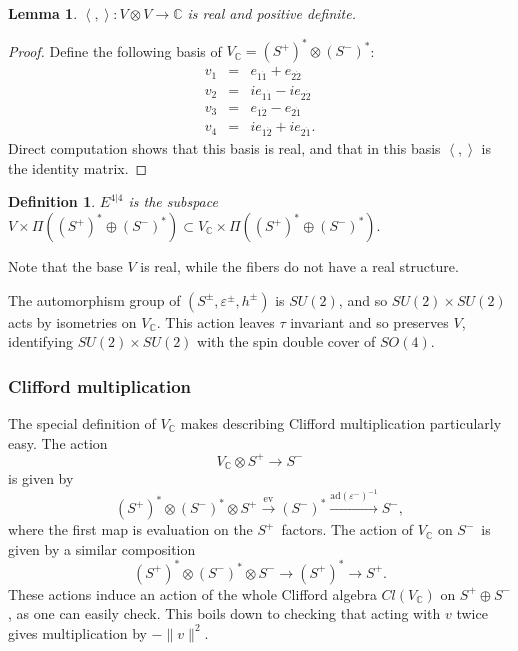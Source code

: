 \documentclass[twoside]{amsart}
\newcommand{\CC}{\ensuremath{\mathbb{C}}}
\newtheorem{definition}{Definition}
\newtheorem{lemma}{Lemma}
\renewcommand{\epsilon}{\varepsilon}
\newcommand{\enm}[1]{\ensuremath{#1}}
\newcommand{\superijk}[3]{\enm{{#1}^{#2|#3}}}
\newcommand{\rrij}[2]{\superijk{E}{#1}{#2}}
\newcommand{\ip}[2]{\enm{\left<#1,#2\right>}}
\newcommand{\sut}{\enm{SU(2)}}
\newcommand{\sof}{\enm{SO(4)}}
\newcommand{\ad}{\enm{\mathrm{ad}}}
\newcommand{\spl}{\enm{S^{+}}}
\newcommand{\sm}{\enm{S^{-}}}
\newcommand{\spd}{\enm{(\spl)^{*}}}
\newcommand{\smd}{\enm{(\sm)^{*}}}
\newcommand{\eps}{\enm{\epsilon}}
\renewcommand{\epsilon}{\varepsilon}
\newcommand{\bothlowerabc}[3]{\enm{{#1}_{#2 #3}}}
\newcommand{\dotbothlowerabc}[3]{\bothlowerabc{#1}{#2}{\dot{#3}}}
\newcommand{\eldl}[2]{\dotbothlowerabc{e}{#1}{#2}}
\begin{document}
\begin{lemma}
    \( \ip{}{}:V\otimes V\to \CC \) is real and positive definite.
\end{lemma}
\begin{proof} Define the following basis of \( V_{\CC} = \spd\otimes\smd \):
\begin{eqnarray}
    v_{1} & = & \eldl{1}{1} + \eldl{2}{2}
    \nonumber  \\
    v_{2} & = & i\eldl{1}{1} - i\eldl{2}{2}
    \label{eq:euclbasis}  \\
    v_{3} & = & \eldl{1}{2} - \eldl{2}{1}
    \nonumber  \\
    v_{4} & = & i\eldl{1}{2} + i\eldl{2}{1}.
    \nonumber
\end{eqnarray}
Direct computation shows that this basis is real, and that in this basis \ip{}{} is the identity
matrix.
\end{proof}

\begin{definition}
    \( \rrij{4}{4} \) is the subspace \(
    V\times\Pi(\spd\oplus\smd)\subset V_{\CC}\times\Pi(\spd\oplus\smd).
    \)
\end{definition}
Note that the base \( V \) is real, while the fibers do not have a
real structure.

The automorphism group of \( (S^{\pm}, \eps^{\pm}, h^{\pm}) \) is
\sut, and so \( \sut\times\sut \) acts by isometries on \( V_{\CC}.
\) This action leaves \( \tau \) invariant and so preserves \( V \),
identifying \( \sut\times\sut \) with the spin double cover of \sof.

\subsubsection{Clifford multiplication}

The special definition of \( V_{\CC} \) makes describing Clifford
multiplication particularly easy.  The action
\[ V_{\CC}\otimes \spl\to \sm \]
is given by
\[ \spd\otimes\smd\otimes\spl \overset{\mathrm{ev}}{\to}
 \smd \overset{\ad(\eps^-)^{-1}}{\longrightarrow} \sm, \]
where the first map is evaluation on the \spl\ factors. The action of
\( V_{\CC} \) on \sm\ is given by a similar
composition
\[ \spd\otimes\smd\otimes\sm \to \spd \to \spl. \]
These actions induce an action of the whole Clifford algebra \(
Cl(V_{\CC}) \) on \( \spl\oplus\sm \), as one can easily check.  This
boils down to checking that acting with \( v \) twice
gives multiplication by \( -\|v\|^{2}. \)
\end{document}
